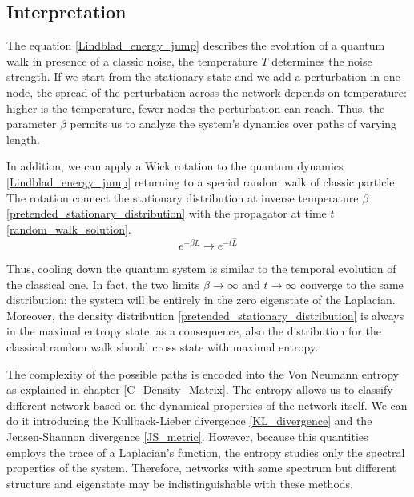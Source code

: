 \subsection{Interpretation}

The equation \eqref{Lindblad_energy_jump} describes the evolution of a quantum walk in presence of a classic noise, the temperature $T$ determines the noise strength.
If we start from the stationary state and we add a perturbation in one node, the spread of the perturbation across the network depends on temperature: higher is the temperature, fewer nodes the perturbation can reach. Thus, the parameter $\beta$ permits us to analyze the system's dynamics over paths of varying length.

In addition, we can apply a Wick rotation to the quantum dynamics \eqref{Lindblad_energy_jump} returning to a special random walk of classic particle. The rotation connect the stationary distribution at inverse temperature $\beta$ \eqref{pretended_stationary_distribution} with the propagator at time $t$ \eqref{random_walk_solution}.
\begin{equation}
e^{-\beta\hat L} \rightarrow e^{-t\hat L}
\end{equation}

Thus, cooling down the quantum system is similar to the temporal evolution of the classical one. In fact, the two limits $\beta \rightarrow \infty$ and $t \rightarrow \infty$ converge to the same distribution: the system will be entirely in the zero eigenstate of the Laplacian.
Moreover, the density distribution \eqref{pretended_stationary_distribution} is always in the maximal entropy state, as a consequence, also the  distribution for the classical random walk should cross state with maximal entropy.

The complexity of the possible paths is encoded into the Von Neumann entropy as explained in chapter \ref{C_Density_Matrix}.
The entropy allows us to classify different network based on the dynamical properties of the network itself. 
We can do it introducing the Kullback-Lieber divergence \eqref{KL_divergence} and the Jensen-Shannon divergence \eqref{JS_metric}.
However, because this quantities employs the trace of a Laplacian's function, the entropy studies only the spectral properties of the system. Therefore, networks with same spectrum but different structure and eigenstate may be indistinguishable with these methods.
